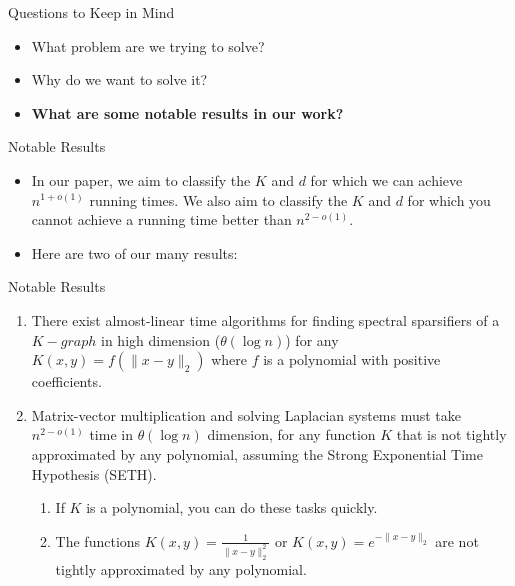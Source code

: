 \begin{frame}{Questions to Keep in Mind}
  \begin{itemize}
\item What problem are we trying to solve?
\item Why do we want to solve it?
\item \textbf{What are some notable results in our work?}
\end{itemize}
\end{frame}

\begin{frame}{Notable Results}
  \begin{itemize}
    \item In our paper, we aim to classify the $K$ and $d$ for which we can
  achieve $n^{1+o(1)}$ running times. We also aim to classify the $K$
  and $d$ for which you cannot achieve a running time better than
  $n^{2-o(1)}$.
    
  \item Here are two of our many results:
  \end{itemize}
\end{frame}

\begin{frame}{Notable Results}
  \begin{enumerate}
    \item <+-> There exist almost-linear time algorithms for finding
      {\color{darkblue}spectral sparsifiers} of a $K-graph$ in high dimension ($\theta(\log n)$) for any
      $K(x, y) = f(\|x-y\|_2)$ where $f$ is a polynomial with positive
      coefficients.
    \item <+-> {\color{red}Matrix-vector multiplication} and
      {\color{darkgreen}solving Laplacian
      systems} must take $n^{2-o(1)}$ time in $\theta(\log n)$ dimension,
      for any function $K$ that is not tightly approximated by any
      polynomial, assuming the Strong Exponential Time Hypothesis
      (SETH). 
      \begin{enumerate}
        \item If $K$ is a polynomial, you can do these tasks quickly.
        \item The functions $K(x,y) = \frac{1}{\|x-y\|_2^2}$ or
          $K(x,y)=e^{-\|x-y\|_2}$ are not tightly approximated by any
          polynomial.
      \end{enumerate}
  \end{enumerate}
\end{frame}

